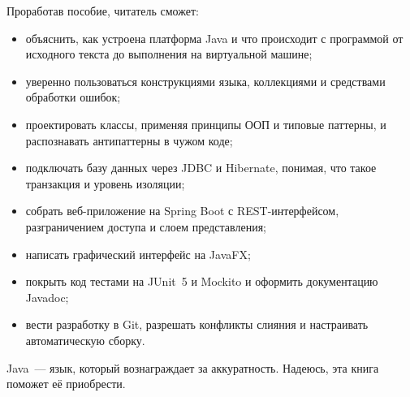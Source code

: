 Проработав пособие, читатель сможет:

\begin{itemize}
  \item объяснить, как устроена платформа Java и что происходит с программой
        от исходного текста до выполнения на виртуальной машине;
  \item уверенно пользоваться конструкциями языка, коллекциями и средствами
        обработки ошибок;
  \item проектировать классы, применяя принципы ООП и типовые паттерны, и
        распознавать антипаттерны в чужом коде;
  \item подключать базу данных через JDBC и Hibernate, понимая, что такое
        транзакция и уровень изоляции;
  \item собрать веб-приложение на Spring Boot с REST-интерфейсом,
        разграничением доступа и слоем представления;
  \item написать графический интерфейс на JavaFX;
  \item покрыть код тестами на JUnit~5 и Mockito и оформить документацию Javadoc;
  \item вести разработку в Git, разрешать конфликты слияния и настраивать
        автоматическую сборку.
\end{itemize}

\vspace{4mm}

Java~--- язык, который вознаграждает за аккуратность. Надеюсь, эта книга поможет
её приобрести.
